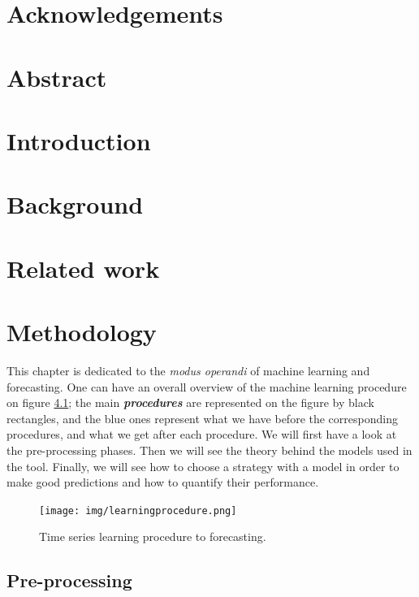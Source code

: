 \documentclass[11pt,a4paper,oneside]{book}
\begin{document}
\chapter*{Acknowledgements}


\tableofcontents


\chapter*{Abstract}


\chapter{Introduction}


\chapter{Background}


\chapter{Related work}



\chapter{Methodology}

This chapter is dedicated to the \textit{modus operandi} of machine learning and forecasting. One can have an overall overview of the machine learning procedure on figure \ref{fig:ML}; the main \textit{\textbf{procedures}} are represented on the figure by black rectangles, and the blue ones represent what we have before the corresponding procedures, and what we get after each procedure. We will first have a look at the pre-processing phases. Then we will see the theory behind the models used in the tool. Finally, we will see how to choose a strategy with a model in order to make good predictions and how to quantify their performance.

\begin{figure}[ht]
  \centering
    \texttt{[image: img/learningprocedure.png]}
  \caption{Time series learning procedure to forecasting.}
  \label{fig:ML}
\end{figure}



\section{Pre-processing}
\end{document}
